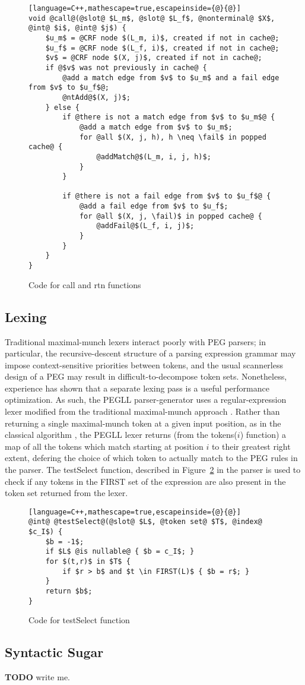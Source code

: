 \documentclass{article}
\newcommand{\fail}{\mathsf{fail}}
\begin{document}
\begin{figure}
\caption{Code for call and rtn functions} \label{call-rtn-code}
\begin{lstlisting}[language=C++,mathescape=true,escapeinside={@}{@}]
void @call@(@slot@ $L_m$, @slot@ $L_f$, @nonterminal@ $X$, @int@ $i$, @int@ $j$) {
	$u_m$ = @CRF node $(L_m, i)$, created if not in cache@;
	$u_f$ = @CRF node $(L_f, i)$, created if not in cache@;
	$v$ = @CRF node $(X, j)$, created if not in cache@;
	if @$v$ was not previously in cache@ {
		@add a match edge from $v$ to $u_m$ and a fail edge from $v$ to $u_f$@;
		@ntAdd@$(X, j)$;
	} else {
		if @there is not a match edge from $v$ to $u_m$@ {
			@add a match edge from $v$ to $u_m$;
			for @all $(X, j, h), h \neq \fail$ in popped cache@ {
				@addMatch@$(L_m, i, j, h)$;
			}
		}

		if @there is not a fail edge from $v$ to $u_f$@ {
			@add a fail edge from $v$ to $u_f$;
			for @all $(X, j, \fail)$ in popped cache@ {
				@addFail@$(L_f, i, j)$;
			}
		}
	}
}
\end{lstlisting}
\end{figure}


\subsection{Lexing}
Traditional maximal-munch lexers interact poorly with PEG parsers; in particular, the recursive-descent structure of a parsing expression grammar may impose context-sensitive priorities between tokens, and the usual scannerless design of a PEG may result in difficult-to-decompose token sets. 
Nonetheless, experience \cite{Ack19,Lau19} has shown that a separate lexing pass is a useful performance optimization.
As such, the PEGLL parser-generator uses a regular-expression lexer modified from the traditional maximal-munch approach \cite{Aetc07}. 
Rather than returning a single maximal-munch token at a given input position, as in the classical algorithm , the PEGLL lexer returns (from the tokens($i$) function) a map of all the tokens which match starting at position $i$ to their greatest right extent, defering the choice of which token to actually match to the PEG rules in the parser. 
The testSelect function, described in Figure~\ref{test-select} in the parser is used to check if any tokens in the FIRST set of the expression \cite{Red09} are also present in the token set returned from the lexer.

\begin{figure}
\caption[testSelect]{Code for testSelect function} \label{test-select}
\begin{lstlisting}[language=C++,mathescape=true,escapeinside={@}{@}]
@int@ @testSelect@(@slot@ $L$, @token set@ $T$, @index@ $c_I$) {
	$b = -1$;
	if $L$ @is nullable@ { $b = c_I$; }
	for $(t,r)$ in $T$ {
		if $r > b$ and $t \in FIRST(L)$ { $b = r$; }
	}
	return $b$;
}
\end{lstlisting}
\end{figure}

\subsection{Syntactic Sugar} \label{syntax-sec}

\textbf{TODO} write me.



\end{document}
